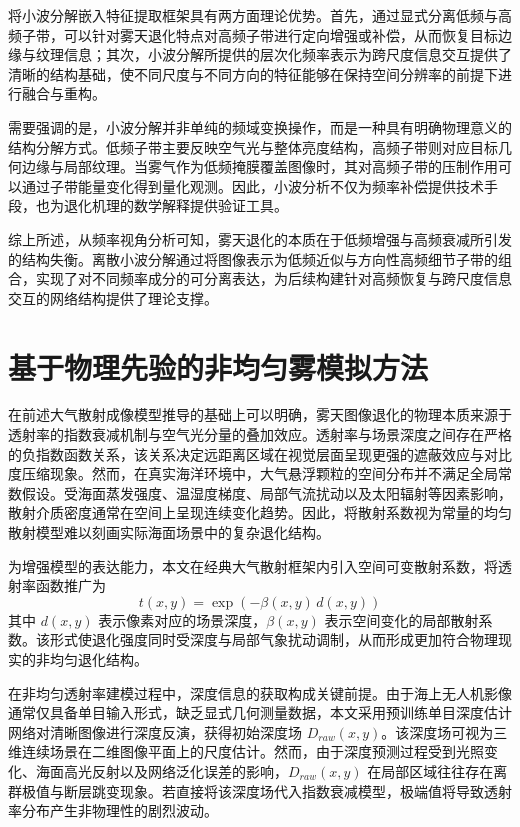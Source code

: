 将小波分解嵌入特征提取框架具有两方面理论优势。首先，通过显式分离低频与高频子带，可以针对雾天退化特点对高频子带进行定向增强或补偿，从而恢复目标边缘与纹理信息；其次，小波分解所提供的层次化频率表示为跨尺度信息交互提供了清晰的结构基础，使不同尺度与不同方向的特征能够在保持空间分辨率的前提下进行融合与重构。

需要强调的是，小波分解并非单纯的频域变换操作，而是一种具有明确物理意义的结构分解方式。低频子带主要反映空气光与整体亮度结构，高频子带则对应目标几何边缘与局部纹理。当雾气作为低频掩膜覆盖图像时，其对高频子带的压制作用可以通过子带能量变化得到量化观测。因此，小波分析不仅为频率补偿提供技术手段，也为退化机理的数学解释提供验证工具。

综上所述，从频率视角分析可知，雾天退化的本质在于低频增强与高频衰减所引发的结构失衡。离散小波分解通过将图像表示为低频近似与方向性高频细节子带的组合，实现了对不同频率成分的可分离表达，为后续构建针对高频恢复与跨尺度信息交互的网络结构提供了理论支撑。


\section{基于物理先验的非均匀雾模拟方法}

在前述大气散射成像模型推导的基础上可以明确，雾天图像退化的物理本质来源于透射率的指数衰减机制与空气光分量的叠加效应。透射率与场景深度之间存在严格的负指数函数关系，该关系决定远距离区域在视觉层面呈现更强的遮蔽效应与对比度压缩现象。然而，在真实海洋环境中，大气悬浮颗粒的空间分布并不满足全局常数假设。受海面蒸发强度、温湿度梯度、局部气流扰动以及太阳辐射等因素影响，散射介质密度通常在空间上呈现连续变化趋势。因此，将散射系数视为常量的均匀散射模型难以刻画实际海面场景中的复杂退化结构。

为增强模型的表达能力，本文在经典大气散射框架内引入空间可变散射系数，将透射率函数推广为
\begin{equation}
t(x,y)=\exp\left(-\beta(x,y)\,d(x,y)\right)
\end{equation}
其中 $d(x,y)$ 表示像素对应的场景深度，$\beta(x,y)$ 表示空间变化的局部散射系数。该形式使退化强度同时受深度与局部气象扰动调制，从而形成更加符合物理现实的非均匀退化结构。

在非均匀透射率建模过程中，深度信息的获取构成关键前提。由于海上无人机影像通常仅具备单目输入形式，缺乏显式几何测量数据，本文采用预训练单目深度估计网络对清晰图像进行深度反演，获得初始深度场 $D_{raw}(x,y)$。该深度场可视为三维连续场景在二维图像平面上的尺度估计。然而，由于深度预测过程受到光照变化、海面高光反射以及网络泛化误差的影响，$D_{raw}(x,y)$ 在局部区域往往存在离群极值与断层跳变现象。若直接将该深度场代入指数衰减模型，极端值将导致透射率分布产生非物理性的剧烈波动。

